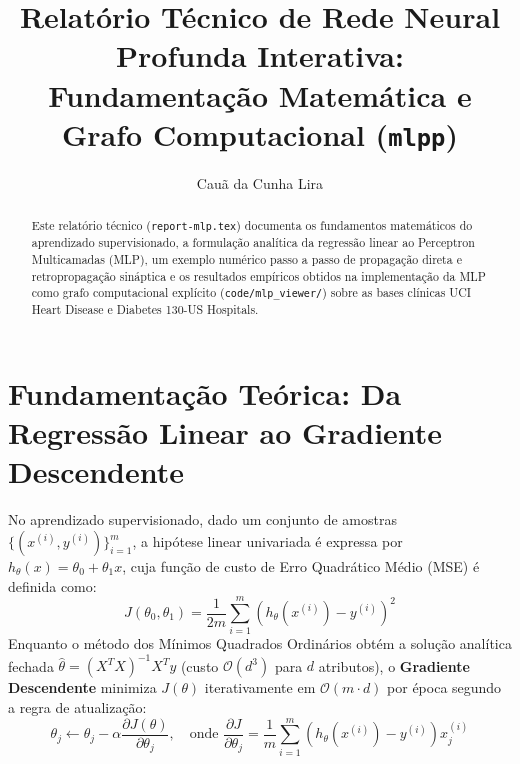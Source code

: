 \documentclass[runningheads]{llncs}
\begin{document}
\title{Relatório Técnico de Rede Neural Profunda Interativa: Fundamentação Matemática e Grafo Computacional (\texttt{mlp\textperiodcentered p})}

\author{Cauã da Cunha Lira}

\maketitle

\begin{abstract}
Este relatório técnico (\texttt{report-mlp.tex}) documenta os fundamentos matemáticos do aprendizado supervisionado, a formulação analítica da regressão linear ao Perceptron Multicamadas (MLP), um exemplo numérico passo a passo de propagação direta e retropropagação sináptica e os resultados empíricos obtidos na implementação da MLP como grafo computacional explícito (\texttt{code/mlp\_viewer/}) sobre as bases clínicas UCI Heart Disease e Diabetes 130-US Hospitals.
\end{abstract}

\section{Fundamentação Teórica: Da Regressão Linear ao Gradiente Descendente}
No aprendizado supervisionado, dado um conjunto de amostras $\{(x^{(i)}, y^{(i)})\}_{i=1}^{m}$, a hipótese linear univariada é expressa por $h_\theta(x) = \theta_0 + \theta_1 x$, cuja função de custo de Erro Quadrático Médio (MSE) é definida como:
\begin{equation}
J(\theta_0, \theta_1) = \frac{1}{2m} \sum_{i=1}^{m} \left( h_\theta(x^{(i)}) - y^{(i)} \right)^2
\end{equation}
Enquanto o método dos Mínimos Quadrados Ordinários obtém a solução analítica fechada $\hat{\theta} = (X^T X)^{-1} X^T y$ (custo $\mathcal{O}(d^3)$ para $d$ atributos), o \textbf{Gradiente Descendente} minimiza $J(\theta)$ iterativamente em $\mathcal{O}(m \cdot d)$ por época segundo a regra de atualização:
\begin{equation}
\theta_j \leftarrow \theta_j - \alpha \frac{\partial J(\theta)}{\partial \theta_j}, \quad \text{onde } \frac{\partial J}{\partial \theta_j} = \frac{1}{m}\sum_{i=1}^{m}\left(h_\theta(x^{(i)}) - y^{(i)}\right)x_j^{(i)}
\end{equation}
\end{document}
